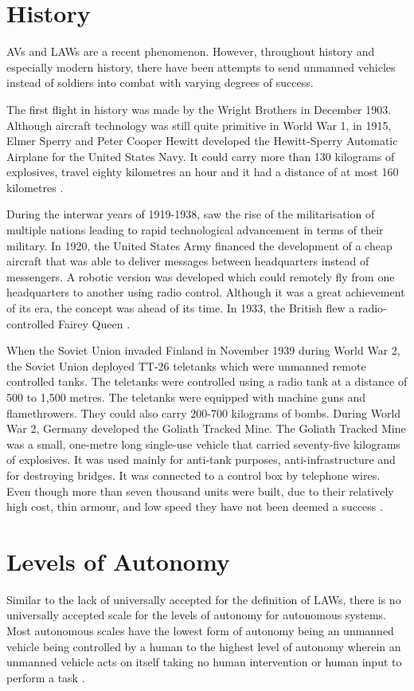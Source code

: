 \documentclass[journal]{IEEEtran}
\begin{document}
\section{History}
AVs and LAWs are a recent phenomenon. However, throughout history and especially modern history, there have been attempts to send unmanned vehicles instead of soldiers into combat with varying degrees of success.

The first flight in history was made by the Wright Brothers in December 1903. Although aircraft technology was still quite primitive in World War 1, in 1915, Elmer Sperry and Peter Cooper Hewitt developed the Hewitt-Sperry Automatic Airplane for the United States Navy. It could carry more than 130 kilograms of explosives, travel eighty kilometres an hour and it had a distance of at most 160 kilometres \cite{whitmore2016evolution}.

During the interwar years of 1919-1938, saw the rise of the militarisation of multiple nations leading to rapid technological advancement in terms of their military. In 1920, the United States Army financed the development of a cheap aircraft that was able to deliver messages between headquarters instead of messengers. A robotic version was developed which could remotely fly from one headquarters to another using radio control. Although it was a great achievement of its era, the concept was ahead of its time. In 1933, the British flew a radio-controlled Fairey Queen \cite{zaloga2011unmanned}.

When the Soviet Union invaded Finland in November 1939 during World War 2, the Soviet Union deployed TT-26 teletanks which were unmanned remote controlled tanks. The teletanks were controlled using a radio tank at a distance of 500 to 1,500 metres. The teletanks were equipped with machine guns and flamethrowers. They could also carry 200-700 kilograms of bombs. During World War 2, Germany developed the Goliath Tracked Mine. The Goliath Tracked Mine was a small, one-metre long single-use vehicle that carried seventy-five kilograms of explosives. It was used mainly for anti-tank purposes, anti-infrastructure and for destroying bridges. It was connected to a control box by telephone wires. Even though more than seven thousand units were built, due to their relatively high cost, thin armour, and low speed they have not been deemed a success \cite{villar2016unmanned}.

\section{Levels of Autonomy}
Similar to the lack of universally accepted for the definition of LAWs, there is no universally accepted scale for the levels of autonomy for autonomous systems. Most autonomous scales have the lowest form of autonomy being an unmanned vehicle being controlled by a human to the highest level of autonomy wherein an unmanned vehicle acts on itself taking no human intervention or human input to perform a task \cite{anderson2015autonomous}.
\end{document}
